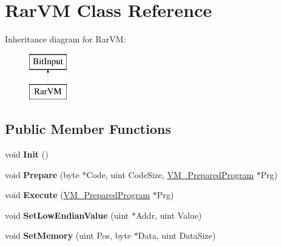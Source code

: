 \hypertarget{class_rar_v_m}{\section{Rar\-V\-M Class Reference}
\label{class_rar_v_m}
}
Inheritance diagram for Rar\-V\-M\-:\begin{figure}[H]
\begin{center}
\leavevmode
\includegraphics[height=2.000000cm]{class_rar_v_m}
\end{center}
\end{figure}
\subsection*{Public Member Functions}
\begin{DoxyCompactItemize}
\item 
\hypertarget{class_rar_v_m_afa9d20c695b5f81ac34d0ca5fd4b1a08}{void {\bfseries Init} ()}\label{class_rar_v_m_afa9d20c695b5f81ac34d0ca5fd4b1a08}

\item 
\hypertarget{class_rar_v_m_a2ed25f5389962c5afd93ccf6fb54d836}{void {\bfseries Prepare} (byte $\ast$Code, uint Code\-Size, \hyperlink{struct_v_m___prepared_program}{V\-M\-\_\-\-Prepared\-Program} $\ast$Prg)}\label{class_rar_v_m_a2ed25f5389962c5afd93ccf6fb54d836}

\item 
\hypertarget{class_rar_v_m_a2485c5618eadfab809c96a2383634dab}{void {\bfseries Execute} (\hyperlink{struct_v_m___prepared_program}{V\-M\-\_\-\-Prepared\-Program} $\ast$Prg)}\label{class_rar_v_m_a2485c5618eadfab809c96a2383634dab}

\item 
\hypertarget{class_rar_v_m_aa7fa8bd5e413e7ae1c9c886e153825e6}{void {\bfseries Set\-Low\-Endian\-Value} (uint $\ast$Addr, uint Value)}\label{class_rar_v_m_aa7fa8bd5e413e7ae1c9c886e153825e6}

\item 
\hypertarget{class_rar_v_m_a98b627565c534ab38e6ea0879252d381}{void {\bfseries Set\-Memory} (uint Pos, byte $\ast$Data, uint Data\-Size)}\label{class_rar_v_m_a98b627565c534ab38e6ea0879252d381}

\end{DoxyCompactItemize}
